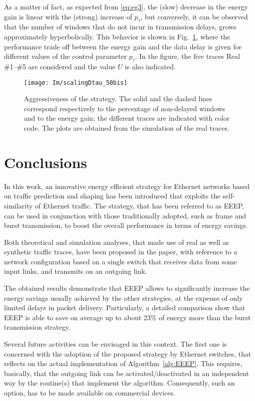 \documentclass[journal,10pt,twoside,final]{IEEEtran}
\begin{document}
As a matter of fact, as expected from \eqref{eq:eg3}, the (slow) decrease in the energy gain is linear with the (strong) increase of $p_\tau$, but conversely, it can be observed that the number of windows that do not incur in transmission delays, grows approximately hyperbolically.
This behavior is shown in Fig.~\ref{fig:scalingDtau}, where the performance trade off between the energy gain and the data delay is given for different values of the control parameter $p_\tau$. In the figure, the five traces Real \#1--\#5 are considered and the value $U$ is also indicated.
\begin{figure}[ht]
\centering
\texttt{[image: Im/scalingDtau\_50bis]}
\caption{Aggressiveness of the strategy. The solid and the dashed lines correspond respectively to the percentage of non-delayed windows and to the energy gain; the different traces are indicated with color code. The plots are obtained from the simulation of the real traces. } 
\label{fig:scalingDtau}
\end{figure}

\section{Conclusions}
\label{sec:conclusions}


In this work, an innovative energy efficient strategy for Ethernet networks based on traffic prediction and shaping has been introduced that exploits the self-similarity of Ethernet traffic. The strategy, that has been referred to as EEEP, can be used in conjunction with those traditionally adopted, such as frame and burst transmission, to boost the overall performance in terms of energy savings. 

Both theoretical and simulation analyses, that made use of real as well as synthetic traffic traces, have been proposed in the paper, with reference to a network configuration based on a single switch that receives data from some input links, and transmits on an outgoing link. 

The obtained results demonstrate that EEEP allows to significantly increase the energy savings usually achieved by the other strategies, at the expense of only limited delays in packet delivery. Particularly, a detailed comparison show that EEEP is able to save on average up to about 23\% of energy more than the burst transmission strategy.   

Several future activities can be envisaged in this context. The first one is concerned with the adoption of the proposed strategy by Ethernet switches, that reflects on the actual implementation of Algorithm~\ref{alg:EEEP}. This requires, basically, that the outgoing link can be activated/deactivated in an independent way by the routine(s) that implement the algorithm. Consequently, such an option, has to be made available on commercial devices.
\end{document}
